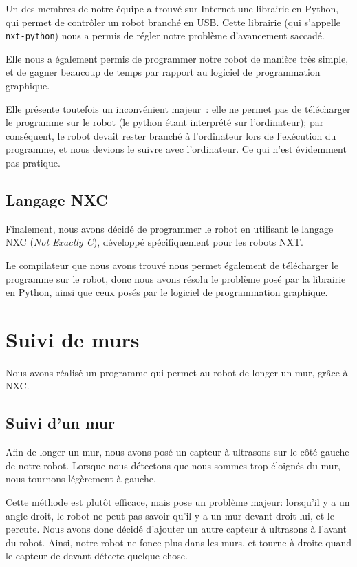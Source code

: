\documentclass{scrartcl}
\begin{document}
Un des membres de notre équipe a trouvé sur Internet une librairie en
Python, qui permet de contrôler un robot branché en USB. Cette
librairie (qui s'appelle \texttt{nxt-python}) nous a permis de régler
notre problème d'avancement saccadé.

Elle nous a également permis de programmer notre robot de manière très
simple, et de gagner beaucoup de temps par rapport au logiciel de
programmation graphique.

Elle présente toutefois un inconvénient majeur~: elle ne permet pas de télécharger
le programme sur le robot (le python étant interprété sur l'ordinateur);
par conséquent, le robot devait rester branché à l'ordinateur lors de
l'exécution du programme, et nous devions le suivre avec l'ordinateur. Ce qui
n'est évidemment pas pratique.

\subsection{Langage NXC}

Finalement, nous avons décidé de programmer le robot en utilisant le
langage NXC (\emph{Not Exactly C}), développé spécifiquement pour
les robots NXT.

Le compilateur que nous avons trouvé nous permet également de
télécharger le programme sur le robot, donc nous avons résolu le
problème posé par la librairie en Python, ainsi que ceux posés par le
logiciel de programmation graphique.

\section{Suivi de murs}

Nous avons réalisé un programme qui permet au robot de longer un mur, grâce
à NXC.

\subsection{Suivi d'un mur}

Afin de longer un mur, nous avons posé un capteur à ultrasons sur le
côté gauche de notre robot. Lorsque nous détectons que nous sommes
trop éloignés du mur, nous tournons légèrement à gauche.

Cette méthode est plutôt efficace, mais pose un problème majeur:
lorsqu'il y a un angle droit, le robot ne peut pas savoir qu'il y a un mur
devant droit lui, et le percute.
Nous avons donc
décidé d'ajouter un autre capteur à ultrasons à l'avant du robot. Ainsi,
notre robot ne fonce plus dans les murs, et tourne à droite quand le
capteur de devant détecte quelque chose.
\end{document}
